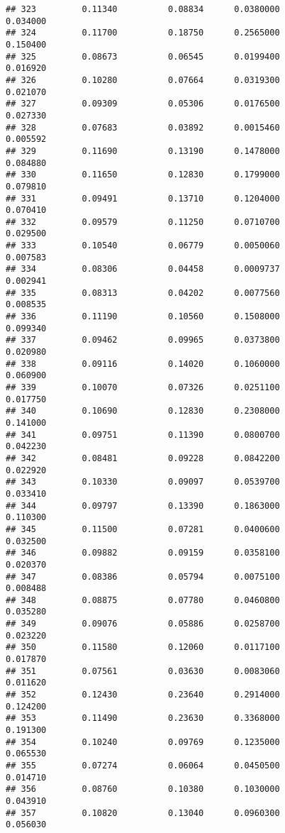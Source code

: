 \documentclass[
]{article}
\begin{document}
\begin{verbatim}
## 323         0.11340          0.08834      0.0380000            0.034000
## 324         0.11700          0.18750      0.2565000            0.150400
## 325         0.08673          0.06545      0.0199400            0.016920
## 326         0.10280          0.07664      0.0319300            0.021070
## 327         0.09309          0.05306      0.0176500            0.027330
## 328         0.07683          0.03892      0.0015460            0.005592
## 329         0.11690          0.13190      0.1478000            0.084880
## 330         0.11650          0.12830      0.1799000            0.079810
## 331         0.09491          0.13710      0.1204000            0.070410
## 332         0.09579          0.11250      0.0710700            0.029500
## 333         0.10540          0.06779      0.0050060            0.007583
## 334         0.08306          0.04458      0.0009737            0.002941
## 335         0.08313          0.04202      0.0077560            0.008535
## 336         0.11190          0.10560      0.1508000            0.099340
## 337         0.09462          0.09965      0.0373800            0.020980
## 338         0.09116          0.14020      0.1060000            0.060900
## 339         0.10070          0.07326      0.0251100            0.017750
## 340         0.10690          0.12830      0.2308000            0.141000
## 341         0.09751          0.11390      0.0800700            0.042230
## 342         0.08481          0.09228      0.0842200            0.022920
## 343         0.10330          0.09097      0.0539700            0.033410
## 344         0.09797          0.13390      0.1863000            0.110300
## 345         0.11500          0.07281      0.0400600            0.032500
## 346         0.09882          0.09159      0.0358100            0.020370
## 347         0.08386          0.05794      0.0075100            0.008488
## 348         0.08875          0.07780      0.0460800            0.035280
## 349         0.09076          0.05886      0.0258700            0.023220
## 350         0.11580          0.12060      0.0117100            0.017870
## 351         0.07561          0.03630      0.0083060            0.011620
## 352         0.12430          0.23640      0.2914000            0.124200
## 353         0.11490          0.23630      0.3368000            0.191300
## 354         0.10240          0.09769      0.1235000            0.065530
## 355         0.07274          0.06064      0.0450500            0.014710
## 356         0.08760          0.10380      0.1030000            0.043910
## 357         0.10820          0.13040      0.0960300            0.056030

\end{verbatim}
\end{document}
